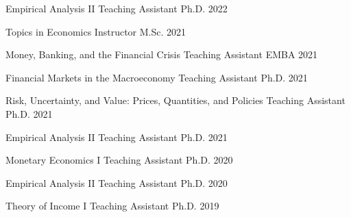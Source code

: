 
\begin{cvhonors}

  \cvhonor
  {Empirical Analysis II} %
  {Teaching Assistant} %
  {Ph.D.} %
  {2022} %

  \cvhonor
  {Topics in Economics} %
  {Instructor} %
  {M.Sc.} %
  {2021} %

  \cvhonor
  {Money, Banking, and the Financial Crisis} %
  {Teaching Assistant} %
  {EMBA} %
  {2021} %

  \cvhonor
  {Financial Markets in the Macroeconomy} %
  {Teaching Assistant} %
  {Ph.D.} %
  {2021} %

  \cvhonor
  {Risk, Uncertainty, and Value: Prices, Quantities, and Policies} %
  {Teaching Assistant} %
  {Ph.D.} %
  {2021} %

  \cvhonor
  {Empirical Analysis II} %
  {Teaching Assistant} %
  {Ph.D.} %
  {2021} %

  \cvhonor
  {Monetary Economics I} %
  {Teaching Assistant} %
  {Ph.D.} %
  {2020} %

  \cvhonor
  {Empirical Analysis II} %
  {Teaching Assistant} %
  {Ph.D.} %
  {2020} %

  \cvhonor
  {Theory of Income I} %
  {Teaching Assistant} %
  {Ph.D.} %
  {2019} %

\end{cvhonors}

